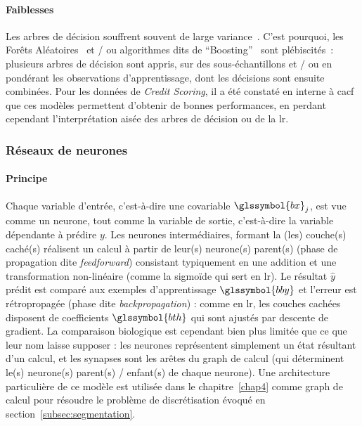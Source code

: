 \paragraph{Faiblesses}

Les arbres de décision souffrent souvent de large variance~\cite{geurts2000investigation}. C'est pourquoi, les Forêts Aléatoires~\cite{breiman2001random} et / ou algorithmes dits de ``Boosting''~\cite{zhou2012ensemble} sont plébiscités~: plusieurs arbres de décision sont appris, sur des sous-échantillons et / ou en pondérant les observations d'apprentissage, dont les décisions sont ensuite combinées. Pour les données de \textit{Credit Scoring}, il a été constaté en interne à \gls{cacf} que ces modèles permettent d'obtenir de bonnes performances, en perdant cependant l'interprétation aisée des arbres de décision ou de la \gls{lr}.

\subsubsection{Réseaux de neurones}

\paragraph{Principe}

Chaque variable d'entrée, c'est-à-dire une covariable $\glssymbol{bx}_j$, est vue comme un neurone, tout comme la variable de sortie, c'est-à-dire la variable dépendante à prédire $y$. Les neurones intermédiaires, formant la (les) couche(s) caché(s) réalisent un calcul à partir de leur(s) neurone(s) parent(s) (phase de propagation dite \textit{feedforward}) consistant typiquement en une addition et une transformation non-linéaire (comme la sigmoïde qui sert en \gls{lr}). Le résultat $\hat{y}$ prédit est comparé aux exemples d'apprentissage $\glssymbol{bby}$ et l'erreur est rétropropagée (phase dite \textit{backpropagation}) : comme en \gls{lr}, les couches cachées disposent de coefficients $\glssymbol{bth}$ qui sont ajustés par descente de gradient. La comparaison biologique est cependant bien plus limitée que ce que leur nom laisse supposer : les neurones représentent simplement un état résultant d'un calcul, et les synapses sont les arêtes du graph de calcul (qui déterminent le(s) neurone(s) parent(s) / enfant(s) de chaque neurone). Une architecture particulière de ce modèle est utilisée dans le chapitre~\ref{chap4} comme graph de calcul pour résoudre le problème de discrétisation évoqué en section~\ref{subsec:segmentation}.

